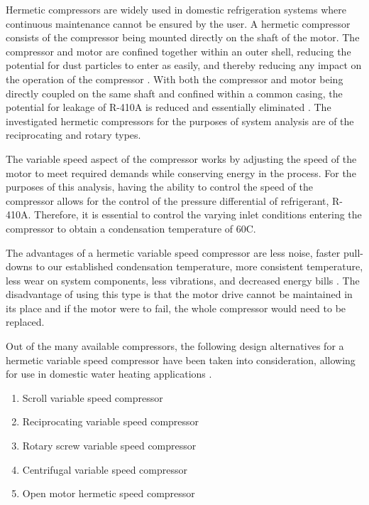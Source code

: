\medskip
Hermetic compressors are widely used in domestic refrigeration systems where continuous maintenance cannot be ensured by the user. A hermetic compressor consists of the compressor being mounted directly on the shaft of the motor. The compressor and motor are confined together within an outer shell, reducing the potential for dust particles to enter as easily, and thereby reducing any impact on the operation of the compressor \cite{hermetic_compressors}. With both the compressor and motor being directly coupled on the same shaft and confined within a common casing, the potential for leakage of R-410A is reduced and essentially eliminated \cite{what_hermetic_compressor}. The investigated hermetic compressors for the purposes of system analysis are of the reciprocating and rotary types.

\medskip
The variable speed aspect of the compressor works by adjusting the speed of the motor to meet required demands while conserving energy in the process. For the purposes of this analysis, having the ability to control the speed of the compressor allows for the control of the pressure differential of refrigerant, R-410A. Therefore, it is essential to control the varying inlet conditions entering the compressor to obtain a condensation temperature of 60\textdegree C.

\medskip
The advantages of a hermetic variable speed compressor are less noise, faster pull-downs to our established condensation temperature, more consistent temperature, less wear on system components, less vibrations, and decreased energy bills \cite{emerson_hermetic}. The disadvantage of using this type is that the motor drive cannot be maintained in its place and if the motor were to fail, the whole compressor would need to be replaced.

\medskip
Out of the many available compressors, the following design alternatives for a hermetic variable speed compressor have been taken into consideration, allowing for use in domestic water heating applications \cite{how_compressor_works} \cite{vapor_compression_refrigeration}.

\medskip
\begin{enumerate}[itemsep=3mm, parsep=-1mm]
    \item Scroll variable speed compressor \cite{scroll_compressors}
    \item Reciprocating variable speed compressor \cite{variable_speed_hermetic}
    \item Rotary screw variable speed compressor
    \item Centrifugal variable speed compressor
    \item Open motor hermetic speed compressor
\end{enumerate}


